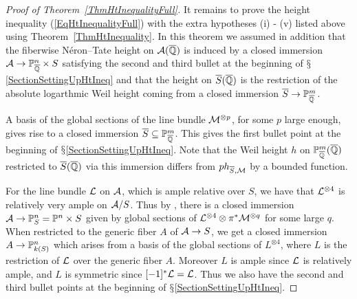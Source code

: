 \begin{proof}[Proof of Theorem~\ref{ThmHtInequalityFull}]
It remains to prove the height inequality (\ref{EqHtInequalityFull})
with the extra hypotheses (i) - (v) listed above using
Theorem~\ref{ThmHtInequality}. In this theorem we assumed in addition that 
the
fiberwise  N\'eron--Tate height on $\mathcal{A}({\overline{\mathbb{Q}}})$
is induced by  a closed immersion $\mathcal{A} \rightarrow {\mathbb{P}}^n_{{\overline{\mathbb{Q}}}}
\times S$ satisfying the second and third bullet  at the beginning of
$\mathsection$\ref{SectionSettingUpHtIneq} and
that the height on $\overline S({\overline{\mathbb{Q}}})$ is the restriction of the absolute
logarthmic Weil height coming from a closed immersion
$\overline S\rightarrow{\mathbb{P}}^m_{{\overline{\mathbb{Q}}}}$. 

A basis of the global sections of the line bundle ${\mathcal M}^{\otimes p}$,
for some $p$ large enough, gives rise to a closed immersion $\overline S \subseteq
{\mathbb{P}}_{{\overline{\mathbb{Q}}}}^m$. This gives the first bullet point at the beginning of
$\mathsection$\ref{SectionSettingUpHtIneq}. Note that the Weil
height $h$ on ${\mathbb{P}}_{\overline{\mathbb{Q}}}^m({\overline{\mathbb{Q}}})$ restricted to $\overline
S({\overline{\mathbb{Q}}})$ via this immersion differs from 
$p h_{\overline S,{\mathcal M}}$ by a bounded function.

For the line bundle ${\mathcal L}$ on $\mathcal{A}$, which is ample relative over $S$, we have that ${\mathcal L}^{\otimes 4}$ is relatively very ample on $\mathcal{A}/S$. Thus by  \cite[Proposition~4.4.10.(ii) and Proposition~4.1.4]{EGAII}, there is a closed immersion $\mathcal{A} \rightarrow {\mathbb{P}}^n_S = {\mathbb{P}}^n \times S$ given by global sections of ${\mathcal L}^{\otimes 4} \otimes \pi^*{\mathcal M}^{\otimes q}$ for some large $q$. When restricted to the generic fiber $A$ of $\mathcal{A} \rightarrow S$, we get a closed immersion $A \rightarrow {\mathbb{P}}^n_{k(S)}$ which arises from a basis of the global sections of $L^{\otimes 4}$, where $L$ is the restriction of ${\mathcal L}$ over the generic fiber $A$. Moreover $L$ is ample since ${\mathcal L}$ is relatively ample, and $L$ is symmetric since $[-1]^*{\mathcal L} = {\mathcal L}$. Thus we also have the second and third bullet points at the beginning of $\mathsection$\ref{SectionSettingUpHtIneq}.


\end{proof}
